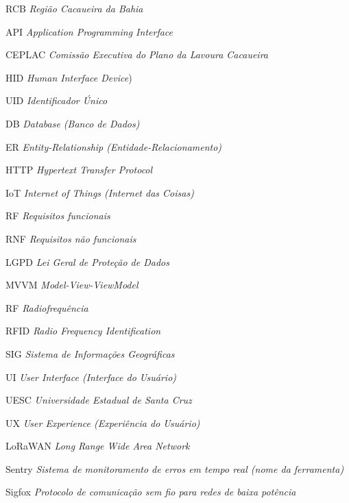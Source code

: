 \begin{siglas}
    \item[RCB]      \textit{Região Cacaueira da Bahia}
    \item[API]      \textit{Application Programming Interface}
    \item[CEPLAC]   \textit{Comissão Executiva do Plano da Lavoura Cacaueira}
    \item[HID]      \textit{Human Interface Device})
    \item[UID]      \textit{Identificador Único}
    \item[DB]       \textit{Database (Banco de Dados)}
    \item[ER]       \textit{Entity-Relationship (Entidade-Relacionamento)}
    \item[HTTP]     \textit{Hypertext Transfer Protocol}
    \item[IoT]      \textit{Internet of Things (Internet das Coisas)}
    \item[RF]       \textit{Requisitos funcionais}
    \item[RNF]      \textit{Requisitos não funcionais}
    \item[LGPD]     \textit{Lei Geral de Proteção de Dados}
    \item[MVVM]     \textit{Model-View-ViewModel}
    \item[RF]       \textit{Radiofrequência}
    \item[RFID]     \textit{Radio Frequency Identification}
    \item[SIG]      \textit{Sistema de Informações Geográficas}
    \item[UI]       \textit{User Interface (Interface do Usuário)}
    \item[UESC]     \textit{Universidade Estadual de Santa Cruz}
    \item[UX]       \textit{User Experience (Experiência do Usuário)}
    \item[LoRaWAN]  \textit{Long Range Wide Area Network}
    \item[Sentry]   \textit{Sistema de monitoramento de erros em tempo real (nome da ferramenta)}
    \item[Sigfox]   \textit{Protocolo de comunicação sem fio para redes de baixa potência}
\end{siglas}
